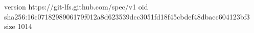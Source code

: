 version https://git-lfs.github.com/spec/v1
oid sha256:16c0718298906179f012a8d623539dcc3051fd18f45cbdef48dbacc604123bf3
size 1014
